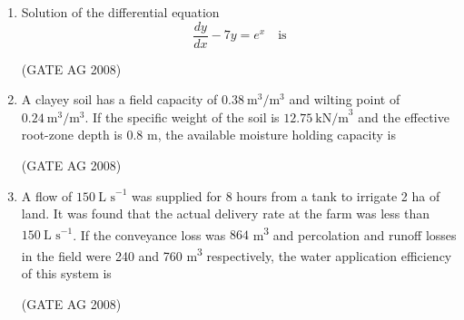 \documentclass[journal,12pt,onecolumn]{IEEEtran}
\begin{document}
\begin{enumerate}
\medskip

\item 
 Solution of the differential equation 
\[\frac{dy}{dx} - 7y = e^x \quad \text{is}\]
\begin{enumerate}
\end{enumerate}
\hfill(GATE AG 2008)\\

\medskip

\item 
 A clayey soil has a field capacity of $0.38\ \text{m}^3/\text{m}^3$ and wilting point of $0.24\ \text{m}^3/\text{m}^3$. If the specific weight of the soil is $12.75\ \text{kN/m}^3$ and the effective root-zone depth is $0.8$ m, the available moisture holding capacity is
\begin{enumerate}
\end{enumerate}
\hfill(GATE AG 2008)\\

\medskip

\item 
 A flow of $150\ \text{L s}^{-1}$ was supplied for 8 hours from a tank to irrigate 2 ha of land. It was found that the actual delivery rate at the farm was less than $150\ \text{L s}^{-1}$. If the conveyance loss was $864$ m\textsuperscript{3} and percolation and runoff losses in the field were 240 and 760 m\textsuperscript{3} respectively, the water application efficiency of this system is
\begin{enumerate}
\end{enumerate}
\hfill(GATE AG 2008)\\


\end{enumerate}
\end{document}
